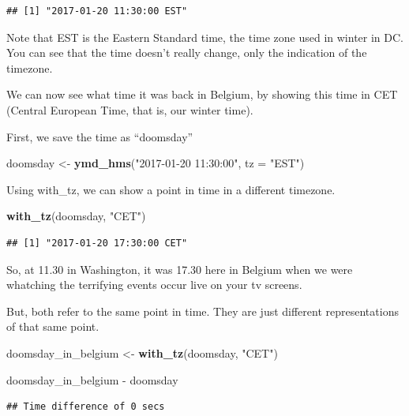 \documentclass[]{tufte-book}
\newenvironment{Shaded}{}{}
\newcommand{\DataTypeTok}[1]{\textcolor[rgb]{0.56,0.13,0.00}{#1}}
\newcommand{\KeywordTok}[1]{\textcolor[rgb]{0.00,0.44,0.13}{\textbf{#1}}}
\newcommand{\NormalTok}[1]{#1}
\newcommand{\OperatorTok}[1]{\textcolor[rgb]{0.40,0.40,0.40}{#1}}
\newcommand{\StringTok}[1]{\textcolor[rgb]{0.25,0.44,0.63}{#1}}
\begin{document}
\begin{verbatim}
## [1] "2017-01-20 11:30:00 EST"
\end{verbatim}

Note that EST is the Eastern Standard time, the time zone used in winter in DC. You can see that the time doesn't really change, only the indication of the timezone.

We can now see what time it was back in Belgium, by showing this time in CET (Central European Time, that is, our winter time).

First, we save the time as ``doomsday''

\begin{Shaded}
\begin{Highlighting}[]
\NormalTok{doomsday <-}\StringTok{ }\KeywordTok{ymd_hms}\NormalTok{(}\StringTok{"2017-01-20 11:30:00"}\NormalTok{, }\DataTypeTok{tz =} \StringTok{"EST"}\NormalTok{)}
\end{Highlighting}
\end{Shaded}

Using with\_tz, we can show a point in time in a different timezone.

\begin{Shaded}
\begin{Highlighting}[]
\KeywordTok{with_tz}\NormalTok{(doomsday, }\StringTok{"CET"}\NormalTok{)}
\end{Highlighting}
\end{Shaded}

\begin{verbatim}
## [1] "2017-01-20 17:30:00 CET"
\end{verbatim}

So, at 11.30 in Washington, it was 17.30 here in Belgium when we were whatching the terrifying events occur live on your tv screens.

But, both refer to the same point in time. They are just different representations of that same point.

\begin{Shaded}
\begin{Highlighting}[]
\NormalTok{doomsday_in_belgium <-}\StringTok{ }\KeywordTok{with_tz}\NormalTok{(doomsday, }\StringTok{"CET"}\NormalTok{) }

\NormalTok{doomsday_in_belgium }\OperatorTok{-}\StringTok{ }\NormalTok{doomsday}
\end{Highlighting}
\end{Shaded}

\begin{verbatim}
## Time difference of 0 secs
\end{verbatim}
\end{document}
